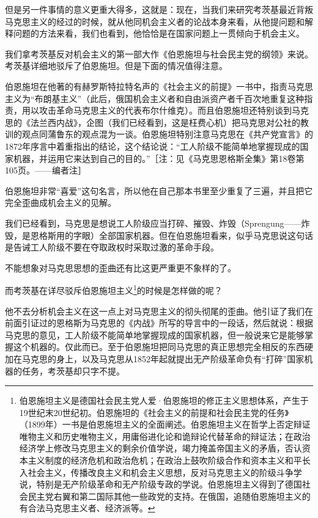 \documentclass[UTF8, 12pt, a4paper]{ctexrep}
\begin{document}
但是另一件事情的意义更重大得多，这就是：现在，当我们来研究考茨基最近背叛马克思主义的经过的时候，就从他同机会主义者的论战本身来看，从他提问题和解释问题的方法来看，我们也看到，他恰恰是在国家问题上一贯倾向于机会主义。

我们拿考茨基反对机会主义的第一部大作《伯恩施坦与社会民主党的纲领》来说。考茨基详细地驳斥了伯恩施坦。但是下面的情况值得注意。

伯恩施坦在他著的有赫罗斯特拉特名声的《社会主义的前提》一书中，指责马克思主义为“布朗基主义”（此后，俄国机会主义者和自由派资产者千百次地重复这种指责，用以攻击革命马克思主义的代表布尔什维克）。而且伯恩施坦还特别谈到马克思的《法兰西内战》，企图（我们已经看到，这是枉费心机）把马克思对公社的教训的观点同蒲鲁东的观点混为一谈。伯恩施坦特别注意马克思在《共产党宣言》的1872年序言中着重指出的结论，这个结论说：“工人阶级不能简单地掌握现成的国家机器，并运用它来达到自己的目的。”［注：见《马克思恩格斯全集》第18卷第105页。——编者注］

伯恩施坦非常“喜爱”这句名言，所以他在自己那本书里至少重复了三遍，并且把它完全歪曲成机会主义的见解。

我们已经看到，马克思是想说工人阶级应当打碎、摧毁、炸毁（Sprengung——炸毁，是恩格斯用的字眼）全部国家机器。但在伯恩施坦看来，似乎马克思说这句话是告诫工人阶级不要在夺取政权时采取过激的革命手段。

不能想象对马克思思想的歪曲还有比这更严重更不象样的了。

而考茨基在详尽驳斥伯恩施坦主义\footnote{伯恩施坦主义是德国社会民主党人爱·伯恩施坦的修正主义思想体系，产生于19世纪末20世纪初。伯恩施坦的《社会主义的前提和社会民主党的任务》（1899年）一书是伯恩施坦主义的全面阐述。伯恩施坦主义在哲学上否定辩证唯物主义和历史唯物主义，用庸俗进化论和诡辩论代替革命的辩证法；在政治经济学上修改马克思主义的剩余价值学说，竭力掩盖帝国主义的矛盾，否认资本主义制度的经济危机和政治危机；在政治上鼓吹阶级合作和资本主义和平长入社会主义，传播改良主义和机会主义思想，反对马克思主义的阶级斗争学说，特别是无产阶级革命和无产阶级专政的学说。伯恩施坦主义得到了德国社会民主党右翼和第二国际其他一些政党的支持。在俄国，追随伯恩施坦主义的有合法马克思主义者、经济派等。}的时候是怎样做的呢？

他不去分析机会主义在这一点上对马克思主义的彻头彻尾的歪曲。他引证了我们在前面引证过的恩格斯为马克思的《内战》所写的导言中的一段话，然后就说：根据马克思的意见，工人阶级不能简单地掌握现成的国家机器，但一般说来它是能够掌握这个机器的。仅此而已。至于伯恩施坦把同马克思的真正思想完全相反的东西硬加在马克思的身上，以及马克思从1852年起就提出无产阶级革命负有“打碎”国家机器的任务，考茨基却只字不提。
\end{document}
